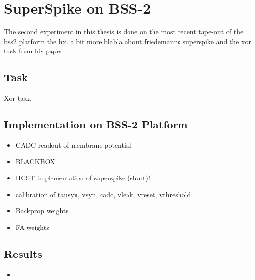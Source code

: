 \section{SuperSpike on BSS-2}

The second experiment in this thesis is done on the most recent tape-out of the \gls{bss2} platform the \gls{hx}. 
a bit more blabla about friedemanns superspike and the xor task from his paper 


\subsection{Task}
Xor task.


\subsection{Implementation on BSS-2 Platform}
\begin{itemize}
	\item CADC readout of membrane potential
	\item BLACKBOX
	\item HOST implementation of superspike (short)!
	\item calibration of tausyn, vsyn, cadc, vleak, vreset, vthreshold
	\item Backprop weights
	\item FA weights
\end{itemize}
	
\subsection{Results}
\begin{itemize}
	\item 
\end{itemize}